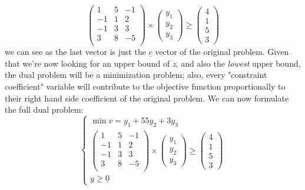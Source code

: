 \documentclass{article}
\begin{document}
					\begin{equation}
						\begin{pmatrix}
							1 & 5 & -1 \\
							-1 & 1 & 2 \\
							-1 & 3 & 3 \\
							3 & 8 & -5 \\
						\end{pmatrix}
						\times
						\begin{pmatrix}y_1 \\ y_2 \\ y_3\end{pmatrix}
						\geq
						\begin{pmatrix} 4 \\ 1 \\ 5 \\ 3 \end{pmatrix}
					\end{equation}
					we can see as the last vector is just the $\underline{c}$ vector of the original problem. Given that we're now looking for an upper bound of \emph{z}, and also the \textit{lowest} upper bound, the dual problem will be a minimization problem; also, every "constraint coefficient" variable will contribute to the objective function proportionally to their right hand side coefficient of the original problem. We can now formulate the full dual problem:
					\begin{equation}
						\begin{cases}
							\min v = y_1 + 55 y_2 + 3 y_3 \\
							\begin{pmatrix}
								1 & 5 & -1 \\
								-1 & 1 & 2 \\
								-1 & 3 & 3 \\
								3 & 8 & -5 \\
							\end{pmatrix}
							\times
							\begin{pmatrix}y_1 \\ y_2 \\ y_3\end{pmatrix}
							\geq
							\begin{pmatrix} 4 \\ 1 \\ 5 \\ 3 \end{pmatrix} \\
							y \geq \underline{0}
						\end{cases}
					\end{equation}
\end{document}
